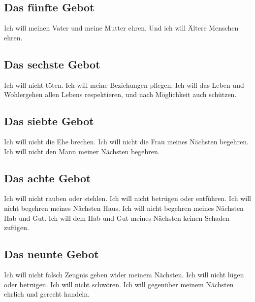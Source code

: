 \documentclass[12pt,a4paper]{article}
\begin{document}
	\subsection{Das f\"unfte Gebot}
		Ich will meinen Vater und meine Mutter ehren.
		Und ich will \"Altere Menschen ehren.
			
	\subsection{Das sechste Gebot}
		Ich will nicht t\"oten.
		Ich will meine Beziehungen pflegen.
		Ich will das Leben und Wohlergehen allen Lebens respektieren,
		und nach M\"oglichkeit auch sch\"utzen.
		
	\subsection{Das siebte Gebot}
		Ich will nicht die Ehe brechen.
		Ich will nicht die Frau meines N\"achsten begehren.
		Ich will nicht den Mann meiner N\"achsten begehren.
		
	\subsection{Das achte Gebot}
		Ich will nicht rauben oder stehlen.
		Ich will nicht betr\"ugen oder entf\"uhren.
		Ich will nicht begehren meines N\"achsten Haus.
		Ich will nicht begehren meines N\"achsten Hab und Gut.
		Ich will dem Hab und Gut meines N\"achsten keinen Schaden zuf\"ugen.
		
	\subsection{Das neunte Gebot}
		Ich will nicht falsch Zeugnis geben wider meinem N\"achsten.
		Ich will nicht l\"ugen oder betr\"ugen.
		Ich will nicht schw\"oren.
		Ich will gegen\"uber meinem N\"achsten ehrlich und gerecht handeln.
		
%
\end{document}
